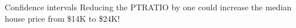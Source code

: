 \documentclass{beamer}\usepackage[]{graphicx}\usepackage[]{color}
\begin{document}
\begin{darkframes}
\begin{frame}[fragile]
     \end{frame}
     
     \begin{frame}[fragile]{Confidence intervals}
        Reducing the PTRATIO by one could increase the median house price from \$14K to \$24K!
        
        \lc
     \end{frame}
        
        
 
  \end{darkframes}
\end{document}
